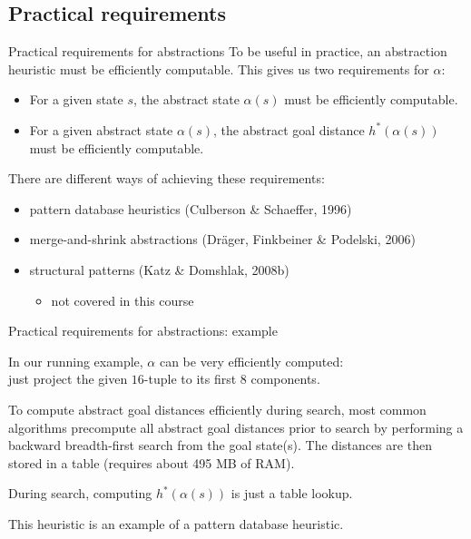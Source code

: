 \documentclass{gkibeamer}
\begin{document}
\subsection{Practical requirements}

\begin{frame}{Practical requirements for abstractions}
  To be useful in practice, an abstraction heuristic must be efficiently
  computable. This gives us two requirements for $\alpha$:
  \begin{itemize}
  \item For a given state $s$, the \alert{abstract state}
    $\alpha(s)$ must be efficiently computable.
  \item For a given abstract state $\alpha(s)$, the \alert{abstract
    goal distance} $h^*(\alpha(s))$ must be efficiently computable.
  \end{itemize}

  \medskip

  There are different ways of achieving these requirements:
  \begin{itemize}
  \item \alert{pattern database heuristics}
    (Culberson \& Schaeffer, 1996)
  \item \alert{merge-and-shrink abstractions}
    (Dr\"ager, Finkbeiner \& Podelski, 2006)
  \item \alert{structural patterns}
    (Katz \& Domshlak, 2008b)
    \begin{itemize}
    \item not covered in this course
    \end{itemize}
  \end{itemize}
\end{frame}

\begin{frame}{Practical requirements for abstractions: example}
  \begin{example}[15-puzzle]
    In our running example, $\alpha$ can be very efficiently
    computed: \\
    just project the given $16$-tuple to its first $8$
    components.

    \medskip

    To compute abstract goal distances efficiently during search, most
    common algorithms precompute \alert{all abstract goal distances}
    prior to search by performing a backward breadth-first search from
    the goal state(s). The distances are then stored in a table
    (requires about 495 MB of RAM).

    During search, computing $h^*(\alpha(s))$ is just a table lookup.
  \end{example}

  This heuristic is an example of a \alert{pattern database
    heuristic}.
\end{frame}
\end{document}

